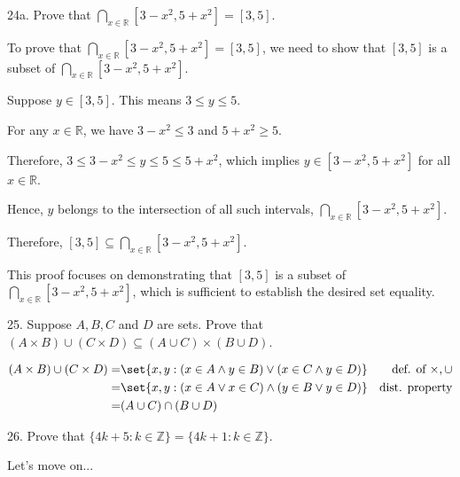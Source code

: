 \documentclass{hippoidC}
\begin{document}
\begin{prooflist}{24a. Prove that $\bigcap_{x \in \mathbb{R}}\left[3-x^2, 5+x^2\right]=[3,5]$.}
	\item
	To prove that $\bigcap_{x \in \mathbb{R}}\left[3-x^2, 5+x^2\right]=[3,5]$, we need to show that $[3,5]$ is a subset of $\bigcap_{x \in \mathbb{R}}\left[3-x^2, 5+x^2\right]$.

	\item Suppose $y \in [3,5]$. This means $3 \leq y \leq 5$.

	\item For any $x \in \mathbb{R}$, we have $3 - x^2 \leq 3$ and $5 + x^2 \geq 5$.

	\item Therefore, $3 \leq 3 - x^2 \leq y \leq 5 \leq 5 + x^2$, which implies $y \in \left[3-x^2, 5+x^2\right]$ for all $x \in \mathbb{R}$.

	\item Hence, $y$ belongs to the intersection of all such intervals, $\bigcap_{x \in \mathbb{R}}\left[3-x^2, 5+x^2\right]$.

	\item Therefore, $[3,5] \subseteq \bigcap_{x \in \mathbb{R}}\left[3-x^2, 5+x^2\right]$.

\end{prooflist}

This proof focuses on demonstrating that $[3,5]$ is a subset of $\bigcap_{x \in \mathbb{R}}\left[3-x^2, 5+x^2\right]$, which is sufficient to establish the desired set equality.

\begin{prooflist}{25. Suppose $A, B, C$ and $D$ are sets. Prove that $(A \times
			B) \cup(C \times D) \subseteq(A \cup C) \times(B \cup D)$.} \item
	\begin{align*}
		(A\times B)\cup (C\times D)= & \set{x, y: (x\in A \land y\in B) \lor (x\in C
		\land y\in D) }              & \text{def. of }\times,\cup                                                \\
		=                            & \set{x,y: (x\in A \lor x\in C) \land (y\in B \lor y\in D) } & \text{dist.
		property}                                                                                                \\
		=                            & (A\cup C) \cap (B\cup D)
	\end{align*}
\end{prooflist}

\begin{prooflist}{26. Prove that $\{4 k+5: k \in \mathbb{Z}\}=\{4 k+1: k \in \mathbb{Z}\}$.}
	\item
	Let's move on...
\end{prooflist}
\end{document}
